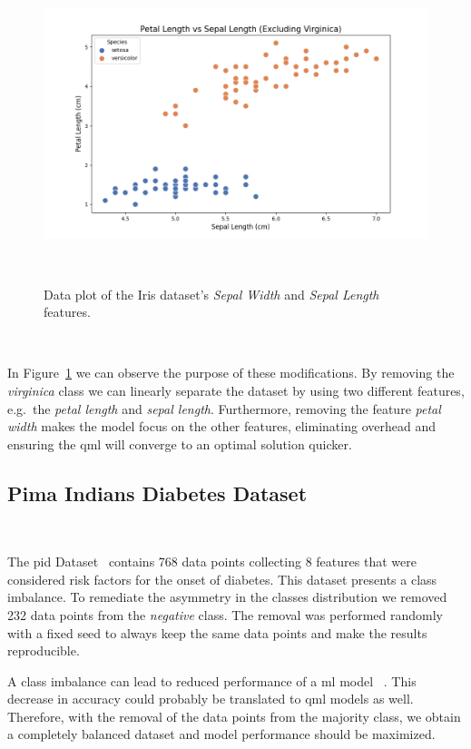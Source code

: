 \begin{figure}[h!]
  \includegraphics[scale=0.5]{figures/iris-linear-separation.png}
  \centering
  \caption{Data plot of the Iris dataset's \textit{Sepal Width} and \textit{Sepal Length} features.}
~\label{fig:iris_linear}
\end{figure} \

In Figure~\ref{fig:iris_linear} we can observe the purpose of these
modifications. By removing the \textit{virginica} class we can
linearly separate the dataset by using two different features,
e.g.\ the \textit{petal length} and \textit{sepal length}. Furthermore,
removing the feature \textit{petal width} makes the model focus on
the other features, eliminating overhead and ensuring the \ac{qml}
will converge to an optimal solution quicker. \

\subsection{Pima Indians Diabetes Dataset}\label{subsection:diabetes} \

The \ac{pid} Dataset~\cite{smith_using_1988} contains
768 data points collecting 8 features that were considered risk
factors for the onset of diabetes. This dataset presents a class
imbalance. To remediate the asymmetry in the classes distribution
we removed 232 data points from the \textit{negative} class. The
removal was performed randomly with a fixed seed to always
keep the same data points and make the results reproducible. \

A class imbalance can lead to reduced performance of a \ac{ml} model
~\cite{drummond_c45_nodate}. This decrease in accuracy could
probably be translated to \ac{qml} models as well. Therefore,
with the removal of the data points from the majority class, we
obtain a completely balanced dataset and model performance should
be maximized. \


